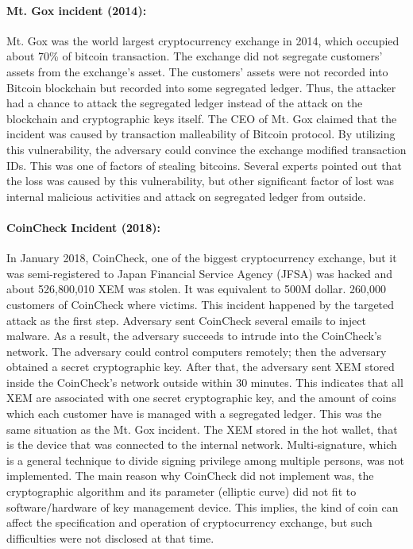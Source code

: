 
\paragraph{Mt. Gox incident (2014):}

Mt. Gox was the world largest cryptocurrency exchange in 2014, which occupied about 70\% of bitcoin transaction.
The exchange did not segregate customers' assets from the exchange's asset.
The customers' assets were not recorded into Bitcoin blockchain
but recorded into some segregated ledger.
Thus, the attacker had a chance to attack the segregated
ledger instead of the attack on the blockchain and cryptographic keys itself.
The CEO of Mt. Gox claimed that the incident was caused by
transaction malleability of Bitcoin protocol.
By utilizing this vulnerability, the adversary
could convince the exchange modified transaction IDs.
This was one of factors of stealing bitcoins.%
Several experts pointed out that the loss was caused by this vulnerability,
but other significant factor of lost was internal malicious activities and
attack on segregated ledger from outside.



\paragraph{CoinCheck Incident (2018):}
In January 2018, CoinCheck, one of the biggest cryptocurrency exchange, but it was semi-registered to Japan Financial Service Agency (JFSA) was hacked and about 526,800,010 XEM was stolen. It was equivalent to 500M dollar. 260,000 customers of CoinCheck where victims.
This incident happened by the targeted attack as the first step. Adversary sent CoinCheck several emails to inject malware. As a result, the adversary succeeds to
intrude into the CoinCheck's network. The adversary could control computers remotely; then the adversary obtained a secret cryptographic key. After that, the adversary
sent XEM stored inside the CoinCheck's network outside within 30 minutes.
This indicates that all XEM are associated with one secret cryptographic key, and the amount of coins which each customer have is managed with a segregated ledger.
This was the same situation as the Mt. Gox incident.
The XEM stored in the hot wallet, that is the device that was connected to the internal network. Multi-signature, which is a general technique to divide signing privilege among
multiple persons, was not implemented. The main reason why CoinCheck did not implement was, the cryptographic algorithm and its parameter (elliptic curve) did not fit to
software/hardware of key management device. This implies, the kind of coin can affect the specification and operation of cryptocurrency exchange, but such
difficulties were not disclosed at that time.

